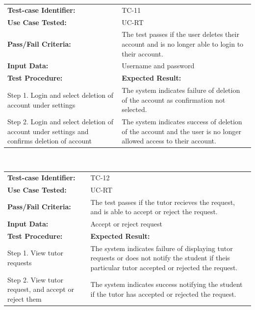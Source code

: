 \documentclass[12pt]{article}
\begin{document}
\begin{tabular}{| p{8cm} | p{8cm} |} \hline
	\textbf{Test-case Identifier:}& TC-11\\
	\textbf{Use Case Tested:}& UC-RT\\
	\textbf{Pass/Fail Criteria:}& The test passes if the user deletes their account and is no longer able to login to their account.\\
	\textbf{Input Data:}& Username and password\\\hline
	\textbf{Test Procedure:}& \textbf{Expected Result:} \\\hline
	Step 1. Login and select deletion of account under settings & The system indicates failure of deletion of the account as confirmation not selected. \\
	Step 2. Login and select deletion of account under settings and confirms deletion of account& The system indicates success of deletion of the account and the user is no longer allowed access to their account.\\
		\hline
\end{tabular}
\\

\begin{tabular}{| p{8cm} | p{8cm} |} \hline
	\textbf{Test-case Identifier:}& TC-12\\
	\textbf{Use Case Tested:}& UC-RT\\
	\textbf{Pass/Fail Criteria:}& The test passes if the tutor recieves the request, and is able to accept or reject the request.\\
	\textbf{Input Data:}& Accept or reject request\\\hline
	\textbf{Test Procedure:}& \textbf{Expected Result:} \\\hline
	Step 1. View tutor requests & The system indicates failure of displaying tutor requests or does not notify the student if theis particular tutor accepted or rejected the request. \\
	Step 2. View tutor request, and accept or reject them & The system indicates success notifying the student if the tutor has accepted or rejected the request.\\
		\hline
\end{tabular}
\\
\end{document}
